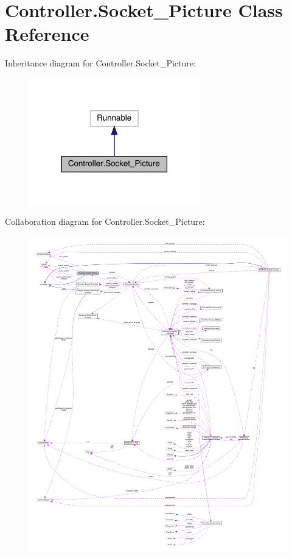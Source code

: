 \hypertarget{class_controller_1_1_socket___picture}{}\section{Controller.\+Socket\+\_\+\+Picture Class Reference}
\label{class_controller_1_1_socket___picture}


Inheritance diagram for Controller.\+Socket\+\_\+\+Picture\+:
\nopagebreak
\begin{figure}[H]
\begin{center}
\leavevmode
\includegraphics[width=210pt]{class_controller_1_1_socket___picture__inherit__graph}
\end{center}
\end{figure}


Collaboration diagram for Controller.\+Socket\+\_\+\+Picture\+:
\nopagebreak
\begin{figure}[H]
\begin{center}
\leavevmode
\includegraphics[width=350pt]{class_controller_1_1_socket___picture__coll__graph}
\end{center}
\end{figure}
